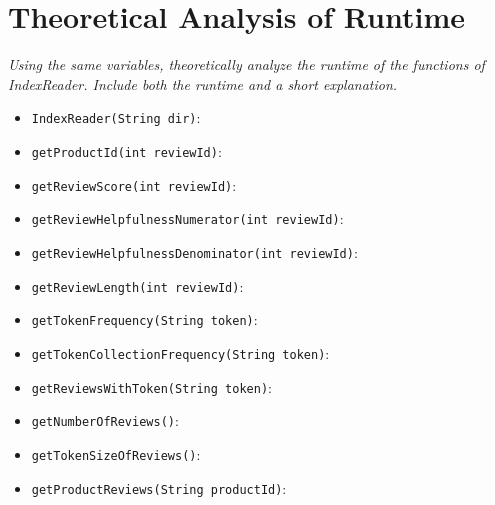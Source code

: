 \documentclass[11pt]{article}
\begin{document}
\section{Theoretical Analysis of Runtime}  

{\em Using the same variables, theoretically analyze the runtime of the functions of IndexReader. Include both the runtime and a short explanation.}

\begin{itemize}
    \item \verb+IndexReader(String dir)+:

    \item \verb+getProductId(int reviewId)+:

	\item \verb+getReviewScore(int reviewId)+:

	\item \verb+getReviewHelpfulnessNumerator(int reviewId)+:

   \item \verb+getReviewHelpfulnessDenominator(int reviewId)+:

    \item \verb+getReviewLength(int reviewId)+:

	\item \verb+getTokenFrequency(String token)+:
    
    \item \verb+getTokenCollectionFrequency(String token)+:


    \item \verb+getReviewsWithToken(String token)+:

    \item \verb+getNumberOfReviews()+:

    \item \verb+getTokenSizeOfReviews()+:

   \item \verb+getProductReviews(String productId)+:
\end{itemize}
\end{document}
